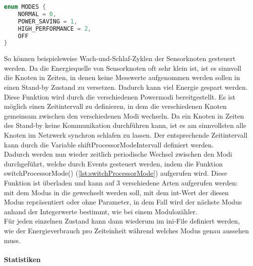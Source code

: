 \begin{minipage}{\textwidth}
\begin{lstlisting}[language=C++, label=lst:ModeEnum, caption=enum MODES]
enum MODES { 
	NORMAL = 0, 
	POWER_SAVING = 1, 
	HIGH_PERFORMANCE = 2, 
	OFF 
}
\end{lstlisting}
\end{minipage}
So können beispielsweise Wach-und-Schlaf-Zyklen der Sensorknoten gesteuert werden. Da die Energiequelle von Sensorknoten oft sehr klein ist, ist es sinnvoll die Knoten in Zeiten, in denen keine Messwerte aufgenommen werden sollen in einen Stand-by Zustand zu versetzen. Dadurch kann viel Energie gespart werden.\\
Diese Funktion wird durch die verschiedenen Powermodi bereitgestellt. Es ist möglich einen Zeitintervall zu definieren, in dem die verschiedenen Knoten gemeinsam zwischen den verschiedenen Modi wechseln. Da ein Knoten in Zeiten des Stand-by keine Kommunikation durchführen kann, ist es am sinnvollsten alle Knoten im Netzwerk synchron schlafen zu lassen. Der entsprechende Zeitintervall kann durch die Variable shiftProcessorModeIntervall definiert werden.\\
Dadurch werden nun wieder zeitlich periodische Wechsel zwischen den Modi durchgeführt, welche durch Events gesteuert werden, indem die Funktion switchProcessorMode() (\ref{lst:switchProcessorMode}) aufgerufen wird. Diese Funktion ist überladen und kann auf 3 verschiedene Arten aufgerufen werden: mit dem Modus in die gewechselt werden soll, mit dem int-Wert der diesen Modus repräsentiert oder ohne Parameter, in dem Fall wird der nächste Modus anhand der Integerwerte bestimmt, wie bei einem Modulozähler.\\
Für jeden einzelnen Zustand kann dann wiederum im ini-File definiert werden, wie der Energieverbrauch pro Zeiteinheit während welches Modus genau aussehen muss.

\paragraph{Statistiken}

